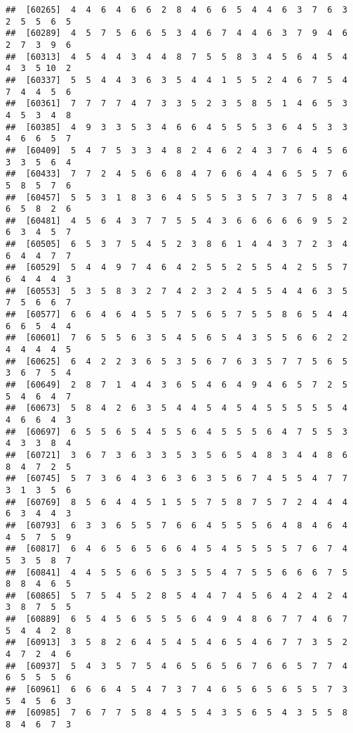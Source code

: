 \documentclass[
]{book}
\begin{document}
\begin{verbatim}
##  [60265]  4  4  6  4  6  6  2  8  4  6  6  5  4  4  6  3  7  6  3  2  5  5  6  5
##  [60289]  4  5  7  5  6  6  5  3  4  6  7  4  4  6  3  7  9  4  6  2  7  3  9  6
##  [60313]  4  5  4  4  3  4  4  8  7  5  5  8  3  4  5  6  4  5  4  4  3  5 10  2
##  [60337]  5  5  4  4  3  6  3  5  4  4  1  5  5  2  4  6  7  5  4  7  4  4  5  6
##  [60361]  7  7  7  7  4  7  3  3  5  2  3  5  8  5  1  4  6  5  3  4  5  3  4  8
##  [60385]  4  9  3  3  5  3  4  6  6  4  5  5  5  3  6  4  5  3  3  4  6  6  5  7
##  [60409]  5  4  7  5  3  3  4  8  2  4  6  2  4  3  7  6  4  5  6  3  3  5  6  4
##  [60433]  7  7  2  4  5  6  6  8  4  7  6  6  4  4  6  5  5  7  6  5  8  5  7  6
##  [60457]  5  5  3  1  8  3  6  4  5  5  5  3  5  7  3  7  5  8  4  6  5  8  2  6
##  [60481]  4  5  6  4  3  7  7  5  5  4  3  6  6  6  6  6  9  5  2  6  3  4  5  7
##  [60505]  6  5  3  7  5  4  5  2  3  8  6  1  4  4  3  7  2  3  4  6  4  4  7  7
##  [60529]  5  4  4  9  7  4  6  4  2  5  5  2  5  5  4  2  5  5  7  6  4  4  4  3
##  [60553]  5  3  5  8  3  2  7  4  2  3  2  4  5  5  4  4  6  3  5  7  5  6  6  7
##  [60577]  6  6  4  6  4  5  5  7  5  6  5  7  5  5  8  6  5  4  4  6  6  5  4  4
##  [60601]  7  6  5  5  6  3  5  4  5  6  5  4  3  5  5  6  6  2  2  4  4  4  4  5
##  [60625]  6  4  2  2  3  6  5  3  5  6  7  6  3  5  7  7  5  6  5  3  6  7  5  4
##  [60649]  2  8  7  1  4  4  3  6  5  4  6  4  9  4  6  5  7  2  5  5  4  6  4  7
##  [60673]  5  8  4  2  6  3  5  4  4  5  4  5  4  5  5  5  5  5  4  4  6  6  4  3
##  [60697]  6  5  5  6  5  4  5  5  6  4  5  5  5  6  4  7  5  5  3  4  3  3  8  4
##  [60721]  3  6  7  3  6  3  3  5  3  5  6  5  4  8  3  4  4  8  6  8  4  7  2  5
##  [60745]  5  7  3  6  4  3  6  3  6  3  5  6  7  4  5  5  4  7  7  3  1  3  5  6
##  [60769]  8  5  6  4  4  5  1  5  5  7  5  8  7  5  7  2  4  4  4  6  3  4  4  3
##  [60793]  6  3  3  6  5  5  7  6  6  4  5  5  5  6  4  8  4  6  4  4  5  7  5  9
##  [60817]  6  4  6  5  6  5  6  6  4  5  4  5  5  5  5  7  6  7  4  5  3  5  8  7
##  [60841]  4  4  5  5  6  6  5  3  5  5  4  7  5  5  6  6  6  7  5  8  8  4  6  5
##  [60865]  5  7  5  4  5  2  8  5  4  4  7  4  5  6  4  2  4  2  4  3  8  7  5  5
##  [60889]  6  5  4  5  6  5  5  5  6  4  9  4  8  6  7  7  4  6  7  5  4  4  2  8
##  [60913]  3  5  8  2  6  4  5  4  5  4  6  5  4  6  7  7  3  5  2  4  7  2  4  6
##  [60937]  5  4  3  5  7  5  4  6  5  6  5  6  7  6  6  5  7  7  4  6  5  5  5  6
##  [60961]  6  6  6  4  5  4  7  3  7  4  6  5  6  5  6  5  5  7  3  5  4  5  6  3
##  [60985]  7  6  7  7  5  8  4  5  5  4  3  5  6  5  4  3  5  5  8  8  4  6  7  3

\end{verbatim}
\end{document}
